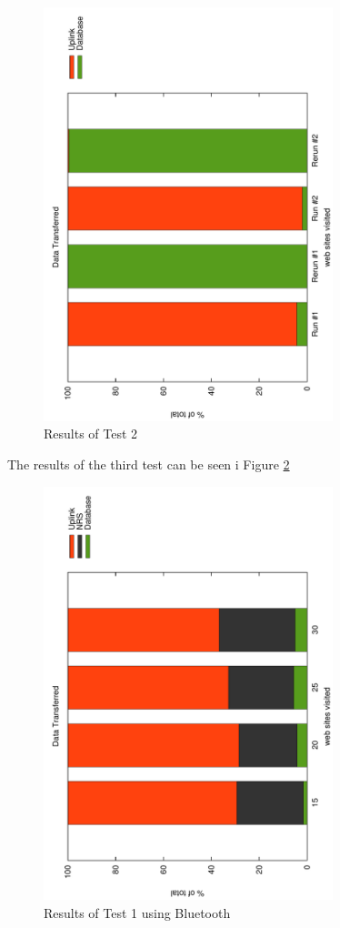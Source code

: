\begin{figure}
	\centering
		\includegraphics[width=0.75\textwidth, angle=-90]{./img/rerun.pdf}
    	\caption{Results of Test 2}
	\label{fig:frontendtest2}
\end{figure}

The results of the third test can be seen i Figure \ref{fig:frontendtest3}

\begin{figure}
	\centering
		\includegraphics[width=0.75\textwidth, angle=-90]{./img/plots.pdf}
    	\caption{Results of Test 1 using Bluetooth}
	\label{fig:frontendtest3}
\end{figure}

